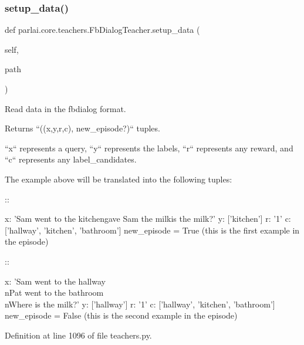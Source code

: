\mbox{\label{classparlai_1_1core_1_1teachers_1_1FbDialogTeacher_a6cb23867e396fac5fdcde509b5da3942}} 
\subsubsection{\texorpdfstring{setup\+\_\+data()}{setup\_data()}}
{\footnotesize\ttfamily def parlai.\+core.\+teachers.\+Fb\+Dialog\+Teacher.\+setup\+\_\+data (\begin{DoxyParamCaption}\item[{}]{self,  }\item[{}]{path }\end{DoxyParamCaption})}

\begin{DoxyVerb}Read data in the fbdialog format.

Returns ``((x,y,r,c), new_episode?)`` tuples.

``x`` represents a query, ``y`` represents the labels, ``r`` represents
any reward, and ``c`` represents any label_candidates.

The example above will be translated into the following tuples:

::

    x: 'Sam went to the kitchen\nPat gave Sam the milk\nWhere is the milk?'
    y: ['kitchen']
    r: '1'
    c: ['hallway', 'kitchen', 'bathroom']
    new_episode = True (this is the first example in the episode)


::

    x: 'Sam went to the hallway\\nPat went to the bathroom\\nWhere is the
milk?'
    y: ['hallway']
    r: '1'
    c: ['hallway', 'kitchen', 'bathroom']
    new_episode = False (this is the second example in the episode)
\end{DoxyVerb}
 

Definition at line 1096 of file teachers.\+py.



